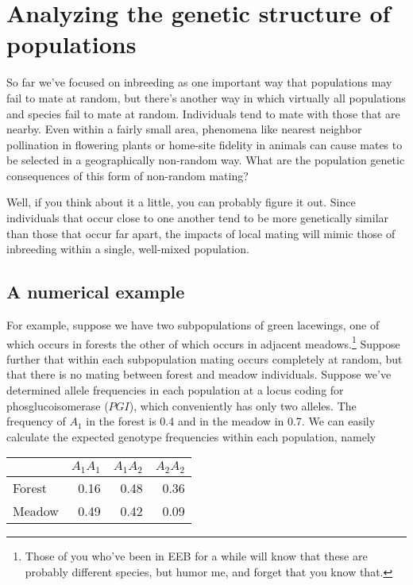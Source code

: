 \chapter{Analyzing the genetic structure of populations}

So far we've focused on inbreeding as one important way that
populations may fail to mate at random, but there's another way in
which virtually all populations and species fail to mate at
random. Individuals tend to mate with those that are nearby. Even
within a fairly small area, phenomena like nearest neighbor
pollination in flowering plants or home-site fidelity in animals can
cause mates to be selected in a geographically non-random way. What
are the population genetic consequences of this form of non-random
mating?

Well, if you think about it a little, you can probably figure it
out. Since individuals that occur close to one another tend to be more
genetically similar than those that occur far apart, the impacts of
local mating will mimic those of inbreeding within a single,
well-mixed population.

\section*{A numerical example}

For example, suppose we have two subpopulations of green lacewings,
one of which occurs in forests the other of which occurs in adjacent
meadows.\footnote{Those of you who've been in EEB for a while will
  know that these are probably different species, but humor me, and
  forget that you know that.} Suppose further that within each
subpopulation mating occurs completely at random, but that there is no
mating between forest and meadow individuals. Suppose we've determined
allele frequencies in each population at a locus coding for
phosglucoisomerase ($PGI$), which conveniently has only two
alleles. The frequency of $A_1$ in the forest is 0.4 and in the meadow
in 0.7. We can easily calculate the expected genotype frequencies
within each population, namely

\begin{center}
\begin{tabular}{l|rrr}
\hline\hline
       & $A_1A_1$ & $A_1A_2$ & $A_2A_2$ \\
\hline
Forest &     0.16 &     0.48 &     0.36 \\
Meadow &     0.49 &     0.42 &     0.09 \\
\hline
\end{tabular}
\end{center}

